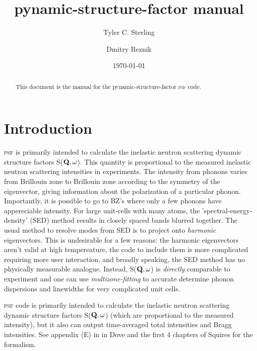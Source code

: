 \documentclass[prl,preprint,aps,superscriptaddress,floatfix]{revtex4-2}
\begin{document}
\title{pynamic-structure-factor manual}

\author{Tyler C. Sterling}

\author{Dmitry Reznik}

\date{\today}

\begin{abstract}
  This document is the manual for the pynamic-structure-factor \textsc{psf} code. 
\end{abstract}


\maketitle


\section{Introduction}

\textsc{psf} is primarily intended to calculate the inelastic neutron scattering dynamic structure factors S($\bf{Q},\omega$). This quantity is proportional to the measured inelastic neutron scattering intensities in experiments. The intensity from phonons varies from Brillouin zone to Brillouin zone according to the symmetry of the eigenvector, giving information about the polarization of a particular phonon. Importantly, it is possible to go to BZ's where only a few phonons have appereciable intensity. For large unit-cells with many atoms, the 'spectral-energy-density' (SED) method results in closely spaced bands blurred together. The usual method to resolve modes from SED is to project onto \emph{harmonic} eigenvectors. This is undesirable for a few reasons: the harmonic eigenvectors aren't valid at high tempereature, the code to include them is more complicated requiring more user interaction, and broadly speaking, the SED method has no physically measurable analogue. Instead, S($\bf{Q},\omega$) is \emph{directly} comparable to experiment and one can use \emph{multizone-fitting} to accurate determine phonon dispersions and linewidths for very complicated unit cells. 

\textsc{psf} code is primarily intended to calculate the inelastic neutron scattering dynamic structure factors S($\bf{Q},\omega$) (which are proportional to the measured intensity), but it also can output time-averaged total intensities and Bragg intensities. See appendix (E) in in Dove \cite{dove} and the first 4 chapters of Squires \cite{squires} for the formalism. 
\end{document}
